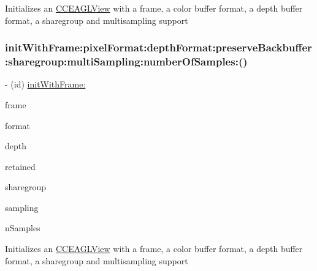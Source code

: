 Initializes an \hyperlink{interfaceCCEAGLView}{C\+C\+E\+A\+G\+L\+View} with a frame, a color buffer format, a depth buffer format, a sharegroup and multisampling support \mbox{\label{interfaceCCEAGLView_adaca2cf585c2dc4881a07bc78a0fad61}} 
\subsubsection{\texorpdfstring{init\+With\+Frame\+:pixel\+Format\+:depth\+Format\+:preserve\+Backbuffer\+:sharegroup\+:multi\+Sampling\+:number\+Of\+Samples\+:()}{initWithFrame:pixelFormat:depthFormat:preserveBackbuffer:sharegroup:multiSampling:numberOfSamples:()}\hspace{0.1cm}{\footnotesize\ttfamily [2/2]}}
{\footnotesize\ttfamily -\/ (id) \hyperlink{interfaceCCEAGLView_a7d569f8fad8006eaa02d9b60f3877e43}{init\+With\+Frame\+:} \begin{DoxyParamCaption}\item[{(C\+G\+Rect)}]{frame }\item[{pixelFormat:(N\+S\+String $\ast$)}]{format }\item[{depthFormat:(G\+Luint)}]{depth }\item[{preserveBackbuffer:(B\+O\+OL)}]{retained }\item[{sharegroup:(E\+A\+G\+L\+Sharegroup $\ast$)}]{sharegroup }\item[{multiSampling:(B\+O\+OL)}]{sampling }\item[{numberOfSamples:(unsigned int)}]{n\+Samples }\end{DoxyParamCaption}}

Initializes an \hyperlink{interfaceCCEAGLView}{C\+C\+E\+A\+G\+L\+View} with a frame, a color buffer format, a depth buffer format, a sharegroup and multisampling support \mbox{\label{interfaceCCEAGLView_adb64cde54fee9dedd5004416f59fc0a7}} 
